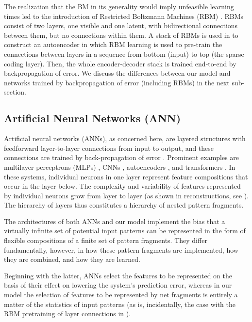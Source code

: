 \documentclass[12pt]{article}
\begin{document}
The realization that the BM in its generality would imply unfeasible learning times led to the introduction of Restricted Boltzmann Machines (RBM) \citep{Smolensky1987,Hinton2006}. RBMs consist of two layers, one visible and one latent, with bidirectional connections between them, but no connections within them. A stack of RBMs is used in \citep{Hinton2006}
to construct an autoencoder in which RBM learning is used to pre-train the connections between layers in a sequence from bottom (input) to top (the sparse coding layer). Then, the whole encoder-decoder stack is trained end-to-end by backpropagation of error.
We discuss the differences between our model and networks trained by backpropagation of error (including RBMs) in the next sub-section.

\subsection{Artificial Neural Networks (ANN)} \label{sec:ANN}

Artificial neural networks (ANNs), as concerned here, are layered structures with feedforward layer-to-layer connections from input to output, and these connections are trained by back-propagation of error \citep[p 292]{rosenblatt_principles_1962}. Prominent examples are multilayer perceptrons (MLPs) \citep{prince2023understanding}, CNNs \citep{lecun1998gradient}, autoencoders \citep{Hinton2006}, and transformers \citep{attention2017}.  In these systems, individual neurons in one layer represent
feature compositions %
that occur in the layer below.  The complexity and variability of features represented by individual neurons grow from layer to layer  (as shown in reconstructions, see \citet{Zeiler2013}). The hierarchy of layers thus constitutes a hierarchy of nested pattern fragments. 

The architectures of both ANNs and our model implement the bias that a virtually infinite set of potential input patterns can be represented in the form of flexible compositions of a finite set of pattern fragments.  They differ fundamentally, however, in how these pattern fragments are implemented, how they are combined, and how they are learned. 

Beginning with the latter, ANNs select the features to be represented on the basis of their effect on lowering the system's prediction error, whereas in our model the selection of features to be represented by net fragments is entirely a matter of the statistics of input patterns (as is, incidentally, the case with the RBM pretraining of layer connections in \citet{Hinton2006}). 
\end{document}
